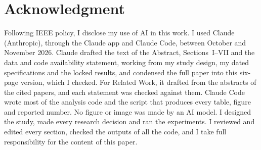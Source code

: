 \documentclass[conference]{IEEEtran}
\begin{document}














\section*{Acknowledgment}
Following IEEE policy, I disclose my use of AI in this work. I used Claude
(Anthropic), through the Claude app and Claude Code, between October and
November 2026. Claude drafted the text of the Abstract, Sections~I--VII and the data and code availability statement, working from my study
design, my dated specifications and the locked results, and condensed the full
paper into this six-page version, which I checked. For Related Work, it
drafted from the abstracts of the cited papers, and each statement was
checked against them. Claude Code wrote most of the analysis code and the
script that produces every table, figure and reported number. No figure or
image was made by an AI model. I designed the study, made every research
decision and ran the experiments. I reviewed and edited every section,
checked the outputs of all the code, and I take full responsibility for the
content of this paper.

\makeatletter{}\undefined\makeatother %

\end{document}
